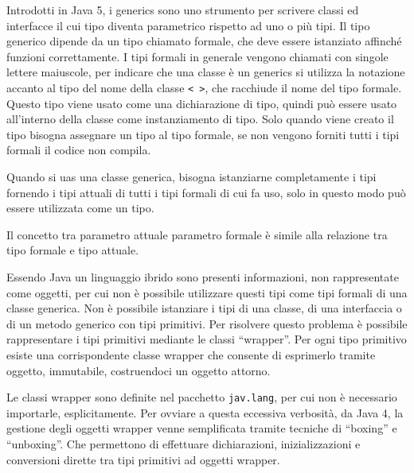 \documentclass{article}
\numberwithin{equation}{subsection}
\begin{document}
Introdotti in Java 5, i generics sono uno strumento per scrivere classi ed interfacce il cui tipo diventa parametrico rispetto ad uno o più tipi. Il tipo generico dipende 
da un tipo chiamato formale, che deve essere istanziato affinché funzioni correttamente. I tipi formali in generale vengono chiamati con singole lettere maiuscole, 
per indicare che una classe è un generics si utilizza la notazione accanto al tipo del nome della classe \verb|< >|, che racchiude il nome del tipo formale. 
Questo tipo viene usato come una dichiarazione di tipo, quindi può essere usato all'interno della classe come instanziamento di tipo. Solo quando viene creato il tipo 
bisogna assegnare un tipo al tipo formale, se non vengono forniti tutti i tipi formali il codice non compila. 

Quando si uas una classe generica, bisogna istanziarne completamente i tipi fornendo i tipi attuali di tutti i tipi formali di cui fa uso, solo in questo modo può essere 
utilizzata come un tipo. 

Il concetto tra parametro attuale parametro formale è simile alla relazione tra tipo formale e tipo attuale. 

Essendo Java un linguaggio ibrido sono presenti informazioni, non rappresentate come oggetti, per cui non è possibile utilizzare questi tipi come tipi formali di una classe 
generica. Non è possibile istanziare i tipi di una classe, di una interfaccia o di un metodo generico con tipi primitivi. Per risolvere questo problema è possibile 
rappresentare i tipi primitivi mediante le classi ``wrapper''. Per ogni tipo primitivo esiste una corrispondente classe wrapper che consente di esprimerlo tramite oggetto, 
immutabile, costruendoci un oggetto attorno. 

Le classi wrapper sono definite nel pacchetto \verb|jav.lang|, per cui non è necessario importarle, esplicitamente. Per ovviare a questa eccessiva verbosità, da 
Java 4, la gestione degli oggetti wrapper venne semplificata tramite tecniche di ``boxing'' e ``unboxing''. Che permettono di effettuare dichiarazioni, inizializzazioni e 
conversioni dirette tra tipi primitivi ad oggetti wrapper. 
\end{document}
